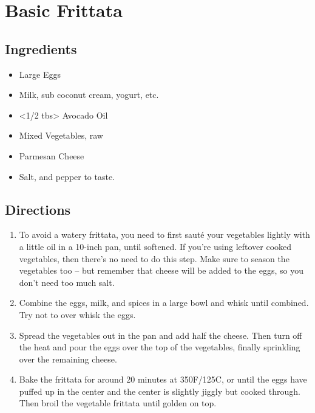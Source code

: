 \section{Basic Frittata}

\subsection{ Ingredients }

\begin{itemize}
  \item <12> Large Eggs
  \item <3 tbs> Milk, sub coconut cream, yogurt, etc.
  \item <1/2 tbs> Avocado Oil
  \item <5 cups> Mixed Vegetables, raw
  \item <1 oz> Parmesan Cheese
  \item <1 tsp> Salt, and pepper to taste. 
\end{itemize}

\subsection{ Directions }

\begin{enumerate}
  \item To avoid a watery frittata, you need to first sauté your vegetables lightly with a little oil in a 10-inch pan, until softened. If you’re using leftover cooked vegetables, then there’s no need to do this step. Make sure to season the vegetables too – but remember that cheese will be added to the eggs, so you don’t need too much salt.
  \item Combine the eggs, milk, and spices in a large bowl and whisk until combined. Try not to over whisk the eggs.
  \item Spread the vegetables out in the pan and add half the cheese. Then turn off the heat and pour the eggs over the top of the vegetables, finally sprinkling over the remaining cheese.
  \item Bake the frittata for around 20 minutes at 350F/125C, or until the eggs have puffed up in the center and the center is slightly jiggly but cooked through. Then broil the vegetable frittata until golden on top.
\end{enumerate}

